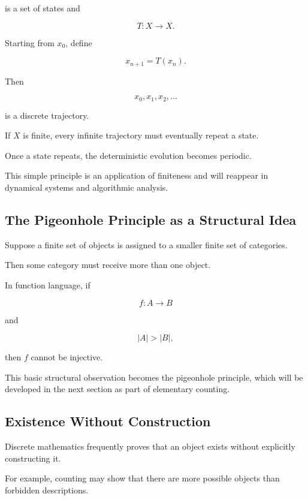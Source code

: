 is a set of states and

\[
T:X\to X.
\]

Starting from \(x_0\), define

\[
x_{n+1}=T(x_n).
\]

Then

\[
x_0,x_1,x_2,\ldots
\]

is a discrete trajectory.

If \(X\) is finite, every infinite trajectory must eventually repeat a
state.

Once a state repeats, the deterministic evolution becomes periodic.

This simple principle is an application of finiteness and will reappear
in dynamical systems and algorithmic analysis.

\subsection{The Pigeonhole Principle as a Structural Idea}
\label{subsec:pigeonhole-structural-preview}

Suppose a finite set of objects is assigned to a smaller finite set of
categories.

Then some category must receive more than one object.

In function language, if

\[
f:A\to B
\]

and

\[
|A|>|B|,
\]

then \(f\) cannot be injective.

This basic structural observation becomes the pigeonhole principle,
which will be developed in the next section as part of elementary
counting.

\subsection{Existence Without Construction}
\label{subsec:existence-without-construction}

Discrete mathematics frequently proves that an object exists without
explicitly constructing it.

For example, counting may show that there are more possible objects
than forbidden descriptions.

